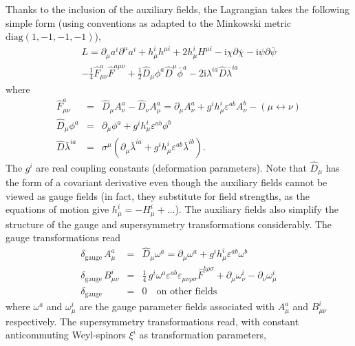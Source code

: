 \documentclass[a4paper,12pt]{article}
\begin{document}
Thanks to the inclusion of the auxiliary fields,
the Lagrangian takes the following simple form
(using conventions as \cite{bra-WB} adapted to
the Minkowski metric $\mathrm{diag}(1,-1,-1,-1)$),
\begin{eqnarray}
L=
\partial _\mu a^i \partial ^\mu a^i+{h_\mu^i h^{\mu i}}
+2{h_\mu^i} H^{\mu i}-{\mathrm{i}} \chi\partial \bar \chi
-{\mathrm{i}} \psi\partial \bar \psi
\nonumber\\
-\frac 14 {\hat F^a_{\mu\nu}\hat F^{a\mu\nu}}
+\frac 12 {\hat D_\mu}\phi^a{\hat D^\mu} \bar \phi^a
-2{\mathrm{i}} \lambda^{ia}{\hat D} \bar \lambda^{ia}
\label{bra-L}
\end{eqnarray}
where
\begin{eqnarray*}
{\hat F^a_{\mu\nu}}&=&{\hat D_\mu} A_\nu^a-{\hat D_\nu} A_\mu^a
=\partial _\mu A_\nu^a+g^i {h_\mu^i}\varepsilon^{ab}A_\nu^b
-(\mu\!\leftrightarrow\!\nu)
\\
{\hat D_\mu}\phi^a&=&\partial _\mu\phi^a+g^i {h_\mu^i}\varepsilon^{ab}\phi^b
\\
{\hat D}\bar \lambda^{ia}&=&\sigma^\mu (\partial _\mu\bar \lambda^{ia}
+g^i {h_\mu^i}\varepsilon^{ab}\bar \lambda^{ib}).
\end{eqnarray*}
The $g^i$ are real coupling constants (deformation parameters). 
Note that ${\hat D_\mu}$ has the form of a covariant derivative
even though the auxiliary fields cannot be viewed
as gauge fields (in fact, they substitute for field strengths,
as the equations of motion give $h_\mu^i=-H_\mu^i+\dots$).
The auxiliary fields also simplify the structure of the gauge
and supersymmetry transformations considerably.
The gauge transformations read
\begin{eqnarray*}
\delta_\mathrm{gauge}\, A_\mu^a&=&
{\hat D_\mu}{\omega^a}=\partial _\mu {\omega^a}
+g^i {h_\mu^i}\varepsilon^{ab}{\omega^b}
\\
\delta_\mathrm{gauge}\, B_{\mu\nu}^i &=& 
\frac 14\, g^i {\omega^a} \varepsilon^{ab}\varepsilon_{\mu\nu\rho\sigma}
{\hat F^{b\rho\sigma}}
+\partial _\mu {\omega^i_\nu}-\partial _\nu {\omega^i_\mu}
\\
\delta_\mathrm{gauge} &=&0\quad\mbox{on other fields}
\end{eqnarray*}
where $\omega^a$ and $\omega_\mu^i$ are the gauge parameter
fields associated with $A^a_\mu$ and $B_{\mu\nu}^i$ respectively.
The supersymmetry transformations read, 
with constant anticommuting Weyl-spinors $\xi^i$ as transformation
parameters,
\end{document}
